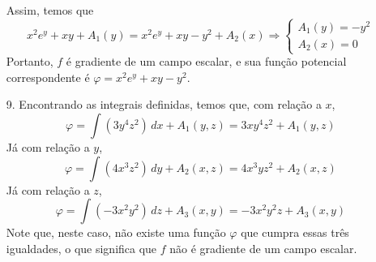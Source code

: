 \documentclass[../main.tex]{subfiles}
\begin{document}
\begin{solucao}
\begin{enumerate}
			Assim, temos que
			\[
			x^2e^y + xy + A_1(y)=x^2e^y+xy-y^2+A_2(x)\Rightarrow \begin{cases}
				A_1(y)=-y^2\\
				A_2(x)=0
			\end{cases}
			\]
			Portanto, $f$ é gradiente de um campo escalar, e sua função potencial correspondente é $\varphi=x^2e^y+xy-y^2$.
			\item[9.] Encontrando as integrais definidas, temos que, com relação a $x$,
			\[
			\varphi=\int (3y^4z^2) \, dx + A_1(y,z)=3xy^4z^2+A_1(y,z)
			\]
			Já com relação a $y$,
			\[
			\varphi= \int (4x^3z^2) \, dy + A_2(x,z)=4x^3yz^2 +A_2(x,z)
			\]
			Já com relação a $z$,
			\[
			\varphi= \int (-3x^2y^2)\, dz + A_3(x,y)=-3x^2y^2z+A_3(x,y)
			\]
			Note que, neste caso, não existe uma função $\varphi$ que cumpra essas três igualdades, o que significa que $f$ não é gradiente de um campo escalar.
		\end{enumerate}
	\end{solucao}
\end{document}
